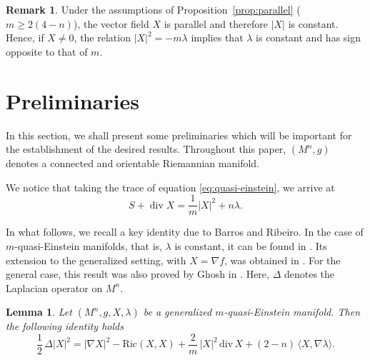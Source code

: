 \documentclass[a4paper, 12pt]{amsart}
\newtheorem{lemma}[theorem]{Lemma}
\theoremstyle{definition}
\newtheorem{remark}[theorem]{Remark}
\numberwithin{figure}{section}
\begin{document}
\begin{remark}
Under the assumptions of Proposition~\ref{prop:parallel} ($m  \geq 2(4-n)$), the vector field \(X\) is parallel and therefore \(|X|\) is constant. Hence, if \(X\not=0\), the relation
$
|X|^2=-m\lambda
$
implies that \(\lambda\) is constant and has sign opposite to that of \(m\).
\end{remark}
\section{Preliminaries}

In this section, we shall present some preliminaries which will be important for the establishment of the desired results. Throughout this paper, \((M^{n},g)\) denotes a connected and orientable Riemannian manifold.%

We notice that taking the trace of equation \eqref{eq:quasi-einstein}, we arrive at  
\begin{equation}\label{eq2}
S + \operatorname{div}X = \frac{1}{m} |X|^2 + n\lambda.
\end{equation}


In what follows, we recall a key identity due to Barros and Ribeiro.
In the case of $m$-quasi-Einstein manifolds, that is, $\lambda$ is constant, it can be found in \cite[p.~215]{BarrosRibeiro2012}. Its extension to the generalized setting, with $X=\nabla f$, was obtained in \cite{BarrosRibeiro2014}. For the general case, this result was also proved by Ghosh in \cite[formula 6.5]{ghosh}. Here, $\Delta$ denotes the Laplacian operator on $M^n$.

\begin{lemma}\label{lem:laplacianX}
Let $(M^n,g,X,\lambda)$ be a generalized $m$-quasi-Einstein manifold. Then the following
identity holds
$$
\frac{1}{2}\,\Delta |X|^{2}
= |\nabla X|^{2}
- \mathrm{Ric}(X,X)
+ \frac{2}{m}\,|X|^{2}\,\mathrm{div}\,X
+ (2-n)\,\langle X,\nabla \lambda\rangle.
$$
\end{lemma}
\end{document}
